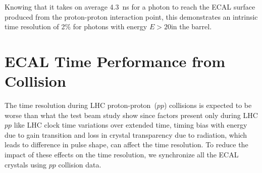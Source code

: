 \vspace{5mm}

Knowing that it takes on average 4.3~ns for a photon to reach the ECAL surface produced from the proton-proton interaction point, this demonstrates an intrinsic time resolution of 2\% for photons with energy $E > 20$\GeV in the barrel.%

\section{ECAL Time Performance from Collision}
The time resolution during LHC proton-proton~($pp$) collisions is expected to be worse than what the test beam study show since factors present only during LHC $pp$ like LHC clock time variations over extended time, timing bias with energy due to gain transition and loss in crystal transparency due to radiation, which leads to difference in pulse shape, can affect the time resolution. To reduce the impact of these effects on the time resolution, we synchronize all the ECAL crystals using $pp$ collision data. 

